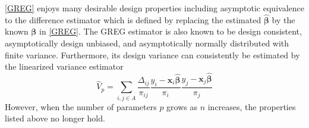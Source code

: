 \documentclass[12pt]{article}
\newcounter{list}
\renewcommand{\bf}[1]{\boldsymbol{\mathbf{#1}}}
\begin{document}
\begin{itemize}
$$$$
\eqref{GREG} enjoys many desirable design properties including asymptotic equivalence to the difference estimator which is defined by replacing the estimated $\hat {\bf \beta}$ by the known $\bf \beta$ in \eqref{GREG}. The GREG estimator is also known to be design consistent, asymptotically design unbiased, and asymptotically normally distributed with finite variance. Furthermore, its design variance can consistently be estimated by the linearized variance estimator
\begin{equation}
    \hat V_p = \sum_{i,j \in A} \frac{\Delta_{ij}}{\pi_{ij}} \frac{y_i - \bf x_i \hat {\bf \beta}}{\pi_i}\frac{y_j - \bf x_j \hat {\bf \beta}}{\pi_j} \label{var}
\end{equation}
However, when the number of parameters $p$ grows as $n$ increases, the properties listed above no longer hold.
\end{itemize}
\end{document}
